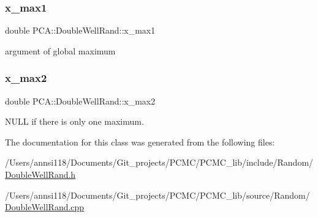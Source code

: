 \hypertarget{class_p_c_a_1_1_double_well_rand_a69b543f7eb8dda81f522a2002af65456}{}\label{class_p_c_a_1_1_double_well_rand_a69b543f7eb8dda81f522a2002af65456} 
\subsubsection{\texorpdfstring{x\+\_\+max1}{x\_max1}}
{\footnotesize\ttfamily double P\+C\+A\+::\+Double\+Well\+Rand\+::x\+\_\+max1\hspace{0.3cm}{\ttfamily [private]}}



argument of global maximum 

\hypertarget{class_p_c_a_1_1_double_well_rand_a2fd3ef155f258ef1393fdb5ae503e2b0}{}\label{class_p_c_a_1_1_double_well_rand_a2fd3ef155f258ef1393fdb5ae503e2b0} 
\subsubsection{\texorpdfstring{x\+\_\+max2}{x\_max2}}
{\footnotesize\ttfamily double P\+C\+A\+::\+Double\+Well\+Rand\+::x\+\_\+max2\hspace{0.3cm}{\ttfamily [private]}}



N\+U\+LL if there is only one maximum. 



The documentation for this class was generated from the following files\+:\begin{DoxyCompactItemize}
\item 
/\+Users/annsi118/\+Documents/\+Git\+\_\+projects/\+P\+C\+M\+C/\+P\+C\+M\+C\+\_\+lib/include/\+Random/\hyperlink{_double_well_rand_8h}{Double\+Well\+Rand.\+h}\item 
/\+Users/annsi118/\+Documents/\+Git\+\_\+projects/\+P\+C\+M\+C/\+P\+C\+M\+C\+\_\+lib/source/\+Random/\hyperlink{_double_well_rand_8cpp}{Double\+Well\+Rand.\+cpp}\end{DoxyCompactItemize}
